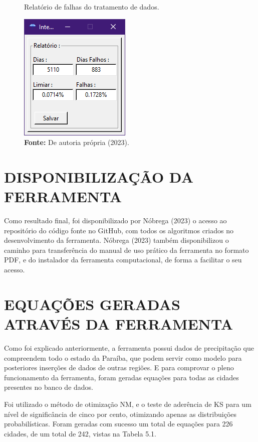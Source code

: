 \begin{figure}[!ht]
	\centering
	\caption{Relatório de falhas do tratamento de dados.}
	\includegraphics[width=.21\linewidth]{figuras/relatorio_de_falhas.png}
	\caption*{\textbf{Fonte:} De autoria própria (2023).}
	\label{fig:figuras/relatorio_de_falhas.png}
\end{figure}

\section{DISPONIBILIZAÇÃO DA FERRAMENTA}

Como resultado final, foi disponibilizado por Nóbrega (2023) o acesso ao repositório do código fonte no GitHub, com todos os algoritmos criados no desenvolvimento da ferramenta. Nóbrega (2023) também disponibilizou o caminho para transferência do manual de uso prático da ferramenta no formato PDF, e do instalador da ferramenta computacional, de forma a facilitar o seu acesso.\bigskip

\section{EQUAÇÕES GERADAS ATRAVÉS DA FERRAMENTA}

Como foi explicado anteriormente, a ferramenta possui dados de precipitação que compreendem todo o estado da Paraíba, que podem servir como modelo para posteriores inserções de dados de outras regiões. E para comprovar o pleno funcionamento da ferramenta, foram geradas equações para todas as cidades presentes no banco de dados. 

Foi utilizado o método de otimização NM, e o teste de aderência de KS para um nível de significância de cinco por cento, otimizando apenas as distribuições probabilísticas. Foram geradas com sucesso um total de equações para 226 cidades, de um total de 242, vistas na Tabela 5.1.\bigskip

\newpage


